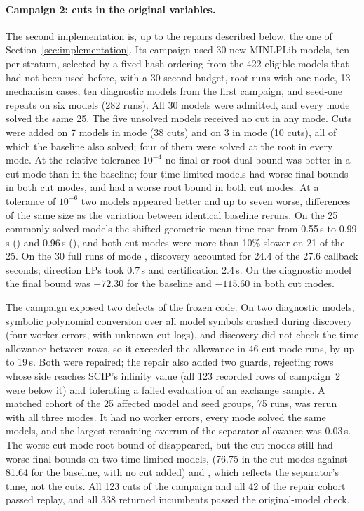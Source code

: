 \paragraph{Campaign 2: cuts in the original variables.}
The second implementation is, up to the repairs described below, the one of
Section~\ref{sec:implementation}. Its campaign used 30 new MINLPLib models, ten
per stratum, selected by a fixed hash ordering from the 422 eligible models
that had not been used before, with a 30-second budget, root runs with one
node, 13 mechanism cases, ten diagnostic models from the first campaign, and
seed-one repeats on six models (282 runs). All 30 models were admitted, and
every mode solved the same 25. The five unsolved models received no cut in any
mode. Cuts were added on 7 models in mode  (38 cuts) and on 3 in mode
 (10 cuts), all of which the baseline also solved; four of them were
solved at the root in every mode. At the relative tolerance $10^{-4}$ no final or
root dual bound was better in a cut mode than in the baseline; four
time-limited models had worse final bounds in both cut modes, and
 had a worse root bound in both cut modes. At a
tolerance of $10^{-6}$ two models appeared better and up to seven worse,
differences of the same size as the variation between identical baseline
reruns. On the 25 commonly solved models the shifted geometric mean time rose
from 0.55\,s to 0.99\,s () and 0.96\,s (), and both cut modes
were more than 10\% slower on 21 of the 25. On the 30 full runs of mode
, discovery accounted for 24.4 of the 27.6 callback seconds; direction
LPs took 0.7\,s and certification 2.4\,s. On the diagnostic model 
the final bound was $-72.30$ for the baseline and $-115.60$ in both cut modes.

The campaign exposed two defects of the frozen code. On two diagnostic models,
symbolic polynomial conversion over all model symbols crashed during discovery
(four worker errors, with unknown cut logs), and discovery did not check the
time allowance between rows, so it exceeded the allowance in 46 cut-mode runs,
by up to 19\,s. Both were repaired; the repair also added two guards, rejecting
rows whose side reaches SCIP's infinity value (all 123 recorded rows of
campaign~2 were below it) and tolerating a failed evaluation of an exchange
sample. A matched cohort of the 25 affected model and seed groups, 75 runs, was
rerun with all three modes. It had no worker errors, every mode solved the
same models, and the largest remaining overrun of the separator allowance was
0.03\,s. The worse cut-mode root bound of 
disappeared, but the cut modes still had worse final bounds on two
time-limited models,  (76.75 in the cut modes against 81.64 for the
baseline, with no cut added) and , which reflects the separator's time, not the cuts.
All 123 cuts of the campaign and all 42 of the repair cohort passed replay, and
all 338 returned incumbents passed the original-model check.
